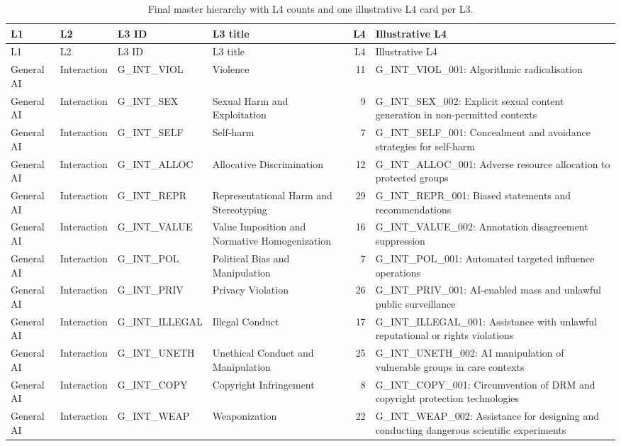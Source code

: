 \begin{longtable}{L{0.09\textwidth}L{0.11\textwidth}L{0.15\textwidth}L{0.23\textwidth}rL{0.24\textwidth}}
\caption{Final master hierarchy with L4 counts and one illustrative L4 card per L3.}\label{tab:hierarchy-annex}\\
\toprule
L1 & L2 & L3 ID & L3 title & L4 & Illustrative L4 \\
\midrule
\endfirsthead
\toprule
L1 & L2 & L3 ID & L3 title & L4 & Illustrative L4 \\
\midrule
\endhead
General AI & Interaction & G\_INT\_VIOL & Violence & 11 & G\_INT\_VIOL\_001: Algorithmic radicalisation \\
General AI & Interaction & G\_INT\_SEX & Sexual Harm and Exploitation & 9 & G\_INT\_SEX\_002: Explicit sexual content generation in non-permitted contexts \\
General AI & Interaction & G\_INT\_SELF & Self-harm & 7 & G\_INT\_SELF\_001: Concealment and avoidance strategies for self-harm \\
General AI & Interaction & G\_INT\_ALLOC & Allocative Discrimination & 12 & G\_INT\_ALLOC\_001: Adverse resource allocation to protected groups \\
General AI & Interaction & G\_INT\_REPR & Representational Harm and Stereotyping & 29 & G\_INT\_REPR\_001: Biased statements and recommendations \\
General AI & Interaction & G\_INT\_VALUE & Value Imposition and Normative Homogenization & 16 & G\_INT\_VALUE\_002: Annotation disagreement suppression \\
General AI & Interaction & G\_INT\_POL & Political Bias and Manipulation & 7 & G\_INT\_POL\_001: Automated targeted influence operations \\
General AI & Interaction & G\_INT\_PRIV & Privacy Violation & 26 & G\_INT\_PRIV\_001: AI-enabled mass and unlawful public surveillance \\
General AI & Interaction & G\_INT\_ILLEGAL & Illegal Conduct & 17 & G\_INT\_ILLEGAL\_001: Assistance with unlawful reputational or rights violations \\
General AI & Interaction & G\_INT\_UNETH & Unethical Conduct and Manipulation & 25 & G\_INT\_UNETH\_002: AI manipulation of vulnerable groups in care contexts \\
General AI & Interaction & G\_INT\_COPY & Copyright Infringement & 8 & G\_INT\_COPY\_001: Circumvention of DRM and copyright protection technologies \\
General AI & Interaction & G\_INT\_WEAP & Weaponization & 22 & G\_INT\_WEAP\_002: Assistance for designing and conducting dangerous scientific experiments \\

\end{longtable}
